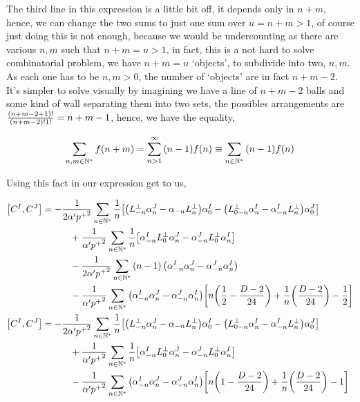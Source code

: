 The third line in this expression is a little bit off, it depends only in $n+m$, hence, we can change the two sums to just one sum over $u=n+m>1$, of course just doing this 
is not enough, because we would be undercounting as there are various $n,m$ such that $n+m=u>1$, in fact, this is a not hard to solve combinatorial problem, 
we have $n+m=u$ `objects', to subdivide into two, $n,m$. As each one has to be $n,m>0$, the number of `objects' are in fact $n+m-2$. It's simpler to solve visually 
by imagining we have a line of $n+m-2$ balls and some kind of wall separating them into two sets, the possibles arrangements are $\frac{\qty(n+m-2+1)!}{\qty(n+m-2)!1!}=n+m-1$, hence, 
we have the equality,

\begin{align*}
    \sum\limits_{n,m\in\mathbb N^\ast}f(n+m)=\sum\limits_{n>1}^\infty\qty(n-1)f(n)\equiv \sum\limits_{n\in\mathbb N^\ast}\qty(n-1)f(n)
\end{align*}

Using this fact in our expression get to us,

\begin{align*}
    \comm{C^{I}}{C^{J}}&=-\frac{1}{2\alpha'{p^+}^2}\sum\limits_{n\in\mathbb N^\ast}\frac{1}{n}\qty[\qty(L^\perp_{-n}\alpha^J_n-\alpha_{-n}L^\perp_n)\alpha_0^I-\qty(L^\perp_{0-n}\alpha^I_n-\alpha^I_{-n}L^\perp_n)\alpha^J_{0}]\\
    &\quad\quad\quad+\frac{1}{ \alpha'{p^+}^2}\sum\limits_{n\in\mathbb N^\ast}\frac1n\qty[\alpha^I_{-n}L^\perp_{0}\alpha_n^J-\alpha^J_{-n}L^\perp_{0}\alpha_n^I]\\
    &\quad\quad\quad-\frac{1}{2\alpha'{p^+}^2}\sum\limits_{n\in\mathbb N^\ast}\qty(n-1)\left(\alpha^I_{-n}\alpha^J_{n}-\alpha^J_{-n}\alpha^I_{n}\right)\\
    &\quad\quad\quad-\frac{1}{\alpha'{p^+}^2}\sum\limits_{n\in\mathbb N^\ast}\qty(\alpha^I_{-n}\alpha^J_n-\alpha^J_{-n}\alpha^I_n)\qty[n\qty(\frac12-\frac{D-2}{24})+\frac1n\qty(\frac{D-2}{24})-\frac12]\\
    \comm{C^{I}}{C^{J}}&=-\frac{1}{2\alpha'{p^+}^2}\sum\limits_{n\in\mathbb N^\ast}\frac{1}{n}\qty[\qty(L^\perp_{-n}\alpha^J_n-\alpha_{-n}L^\perp_n)\alpha_0^I-\qty(L^\perp_{0-n}\alpha^I_n-\alpha^I_{-n}L^\perp_n)\alpha^J_{0}]\\
    &\quad\quad\quad+\frac{1}{ \alpha'{p^+}^2}\sum\limits_{n\in\mathbb N^\ast}\frac1n\qty[\alpha^I_{-n}L^\perp_{0}\alpha_n^J-\alpha^J_{-n}L^\perp_{0}\alpha_n^I]\\
    &\quad\quad\quad-\frac{1}{\alpha'{p^+}^2}\sum\limits_{n\in\mathbb N^\ast}\qty(\alpha^I_{-n}\alpha^J_n-\alpha^J_{-n}\alpha^I_n)\qty[n\qty(1-\frac{D-2}{24})+\frac1n\qty(\frac{D-2}{24})-1]
\end{align*}


